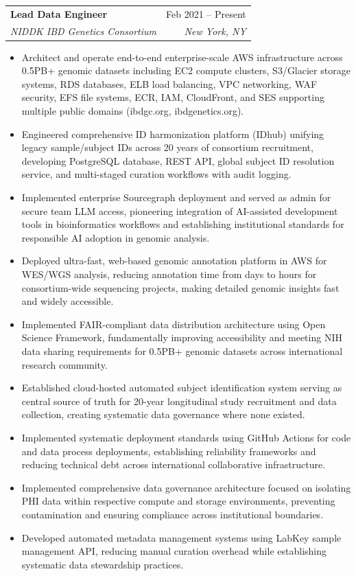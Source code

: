 \documentclass[letterpaper,10]{article}
\makeatletter
\newcommand{\resumeItem}[1]{
  \item\small{
    {#1 \vspace{-2pt}}
  }
}
\newcommand{\resumeSubheading}[4]{
  \vspace{-2pt}\item
    \begin{tabular*}{0.97\textwidth}[t]{l@{\extracolsep{\fill}}r}
      \textbf{#1} & #2 \\
      \textit{\small#3} & \textit{\small #4} \\
    \end{tabular*}\vspace{-7pt}
}
\newcommand{\resumeItemListStart}{\begin{itemize}}
\newcommand{\resumeItemListEnd}{\end{itemize}\vspace{-5pt}}
\makeatother
\begin{document}
    \resumeSubheading
      {Lead Data Engineer}{Feb 2021 -- Present}
      {NIDDK IBD Genetics Consortium}{New York, NY}
      \resumeItemListStart
        \resumeItem{Architect and operate end-to-end enterprise-scale AWS infrastructure across 0.5PB+ genomic datasets including EC2 compute clusters, S3/Glacier storage systems, RDS databases, ELB load balancing, VPC networking, WAF security, EFS file systems, ECR, IAM, CloudFront, and SES supporting multiple public domains (ibdgc.org, ibdgenetics.org).}
        \resumeItem{Engineered comprehensive ID harmonization platform (IDhub) unifying legacy sample/subject IDs across 20 years of consortium recruitment, developing PostgreSQL database, REST API, global subject ID resolution service, and multi-staged curation workflows with audit logging.}
        \resumeItem{Implemented enterprise Sourcegraph deployment and served as admin for secure team LLM access, pioneering integration of AI-assisted development tools in bioinformatics workflows and establishing institutional standards for responsible AI adoption in genomic analysis.}
        \resumeItem{Deployed ultra-fast, web-based genomic annotation platform in AWS for WES/WGS analysis, reducing annotation time from days to hours for consortium-wide sequencing projects, making detailed genomic insights fast and widely accessible.}
        \resumeItem{Implemented FAIR-compliant data distribution architecture using Open Science Framework, fundamentally improving accessibility and meeting NIH data sharing requirements for 0.5PB+ genomic datasets across international research community.}
        \resumeItem{Established cloud-hosted automated subject identification system serving as central source of truth for 20-year longitudinal study recruitment and data collection, creating systematic data governance where none existed.}
        \resumeItem{Implemented systematic deployment standards using GitHub Actions for code and data process deployments, establishing reliability frameworks and reducing technical debt across international collaborative infrastructure.}
        \resumeItem{Implemented comprehensive data governance architecture focused on isolating PHI data within respective compute and storage environments, preventing contamination and ensuring compliance across institutional boundaries.}
        \resumeItem{Developed automated metadata management systems using LabKey sample management API, reducing manual curation overhead while establishing systematic data stewardship practices.}
      \resumeItemListEnd
\end{document}
